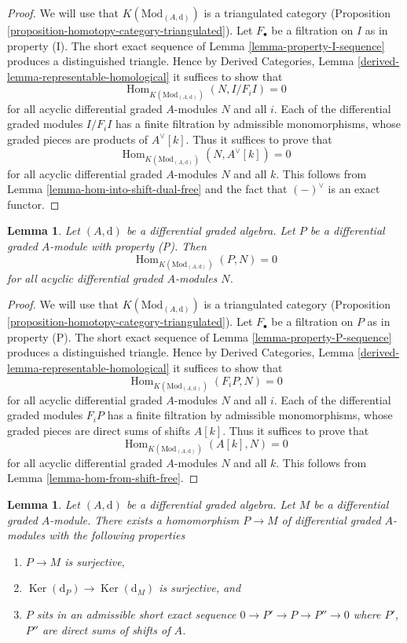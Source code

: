 \documentclass{stacks-project}
\theoremstyle{plain}
\newtheorem{lemma}[subsection]{Lemma}
\theoremstyle{definition}
\theoremstyle{remark}
\numberwithin{equation}{subsection}
\def\Hom{\mathop{\mathrm{Hom}}\nolimits}
\def\Ker{\mathop{\mathrm{Ker}}}
\begin{document}
\begin{proof}
We will use that $K(\text{Mod}_{(A, \text{d})})$ is a triangulated
category (Proposition \ref{proposition-homotopy-category-triangulated}).
Let $F_\bullet$ be a filtration on $I$ as in property (I).
The short exact sequence of Lemma \ref{lemma-property-I-sequence}
produces a distinguished triangle. Hence by
Derived Categories, Lemma \ref{derived-lemma-representable-homological}
it suffices to show that
$$
\Hom_{K(\text{Mod}_{(A, \text{d})})}(N, I/F_iI) = 0
$$
for all acyclic differential graded $A$-modules $N$ and all $i$.
Each of the differential graded modules $I/F_iI$ has a finite filtration
by admissible monomorphisms, whose graded pieces are
products of $A^\vee[k]$. Thus it suffices to prove that
$$
\Hom_{K(\text{Mod}_{(A, \text{d})})}(N, A^\vee[k]) = 0
$$
for all acyclic differential graded $A$-modules $N$ and all $k$.
This follows from Lemma \ref{lemma-hom-into-shift-dual-free}
and the fact that $(-)^\vee$ is an exact functor.
\end{proof}

\begin{lemma}
\label{lemma-property-P-K-projective}
Let $(A, \text{d})$ be a differential graded algebra.
Let $P$ be a differential graded $A$-module with property (P).
Then
$$
\Hom_{K(\text{Mod}_{(A, \text{d})})}(P, N) = 0
$$
for all acyclic differential graded $A$-modules $N$.
\end{lemma}

\begin{proof}
We will use that $K(\text{Mod}_{(A, \text{d})})$ is a triangulated
category (Proposition \ref{proposition-homotopy-category-triangulated}).
Let $F_\bullet$ be a filtration on $P$ as in property (P).
The short exact sequence of Lemma \ref{lemma-property-P-sequence}
produces a distinguished triangle. Hence by
Derived Categories, Lemma \ref{derived-lemma-representable-homological}
it suffices to show that
$$
\Hom_{K(\text{Mod}_{(A, \text{d})})}(F_iP, N) = 0
$$
for all acyclic differential graded $A$-modules $N$ and all $i$.
Each of the differential graded modules $F_iP$ has a finite filtration
by admissible monomorphisms, whose graded pieces are direct sums
of shifts $A[k]$. Thus it suffices to prove that
$$
\Hom_{K(\text{Mod}_{(A, \text{d})})}(A[k], N) = 0
$$
for all acyclic differential graded $A$-modules $N$ and all $k$.
This follows from Lemma \ref{lemma-hom-from-shift-free}.
\end{proof}

\begin{lemma}
\label{lemma-good-quotient}
Let $(A, \text{d})$ be a differential graded algebra.
Let $M$ be a differential graded $A$-module. There exists a homomorphism
$P \to M$ of differential graded $A$-modules with the following
properties
\begin{enumerate}
\item $P \to M$ is surjective,
\item $\Ker(\text{d}_P) \to \Ker(\text{d}_M)$ is surjective, and
\item $P$ sits in an admissible short exact sequence
$0 \to P' \to P \to P'' \to 0$ where $P'$, $P''$ are direct sums
of shifts of $A$.
\end{enumerate}
\end{lemma}
\end{document}
